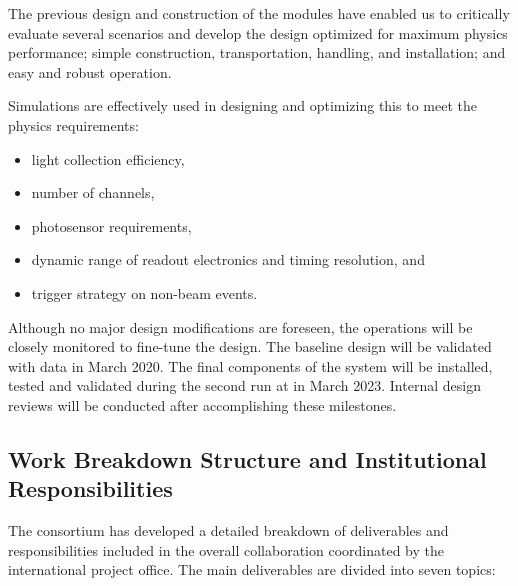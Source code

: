 The previous design and construction of the  modules have enabled us to critically evaluate several scenarios and develop the   design optimized for maximum physics performance; simple construction, transportation, handling, and installation; and easy and robust operation.

Simulations are effectively used in designing and optimizing this   to meet the physics requirements:
\begin{itemize}
\item light collection efficiency,
\item number of channels,
\item photosensor requirements,
\item dynamic range of readout electronics and timing resolution, and 
\item trigger strategy on non-beam events.
\end{itemize}

Although no major design modifications are foreseen, the  operations will be closely monitored to fine-tune the  design. The baseline design will be validated with  data in March \num{2020}. The final components of the system will be installed, tested and validated during the second  run at  in March \num{2023}. Internal design reviews will be conducted after accomplishing these milestones.  

\subsection{Work Breakdown Structure and Institutional Responsibilities}

The   consortium has developed a detailed breakdown of deliverables and responsibilities  included in the overall  collaboration  %
coordinated by the international project office. The main deliverables are %
divided into seven topics: 


